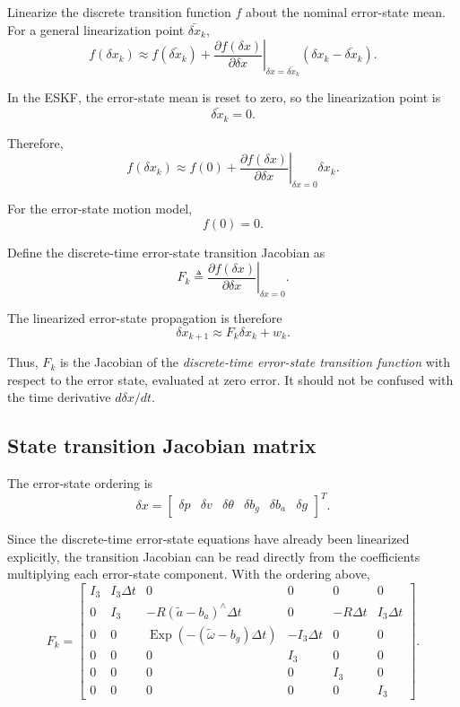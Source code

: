 \documentclass[11pt]{article}
\numberwithin{equation}{section}
\newcommand{\Exp}{\operatorname{Exp}}
\begin{document}
Linearize the discrete transition function $f$ about the nominal
error-state mean.  For a general linearization point
$\bar{\delta x}_k$,
\[
f(\delta x_k)
\approx
f(\bar{\delta x}_k)
+
\left.
\frac{\partial f(\delta x)}
{\partial\delta x}
\right|_{\delta x=\bar{\delta x}_k}
(\delta x_k-\bar{\delta x}_k).
\]

In the ESKF, the error-state mean is reset to zero, so the
linearization point is
\[
\bar{\delta x}_k=0.
\]

Therefore,
\[
f(\delta x_k)
\approx
f(0)
+
\left.
\frac{\partial f(\delta x)}
{\partial\delta x}
\right|_{\delta x=0}
\delta x_k.
\]

For the error-state motion model,
\[
f(0)=0.
\]

Define the discrete-time error-state transition Jacobian as
\begin{equation}
\boxed{
F_k
\triangleq
\left.
\frac{\partial f(\delta x)}
{\partial\delta x}
\right|_{\delta x=0}.
}
\end{equation}

The linearized error-state propagation is therefore
\begin{equation}
\boxed{
\delta x_{k+1}
\approx
F_k\delta x_k+w_k.
}
\end{equation}

Thus, $F_k$ is the Jacobian of the \emph{discrete-time error-state
transition function} with respect to the error state, evaluated at
zero error.  It should not be confused with the time derivative
$d\delta x/dt$.

\subsection{State transition Jacobian matrix}

The error-state ordering is
\begin{equation}
\boxed{
\delta x
=
\begin{bmatrix}
\delta p &
\delta v &
\delta\theta &
\delta b_g &
\delta b_a &
\delta g
\end{bmatrix}^{T}.
}
\end{equation}

Since the discrete-time error-state equations have already been
linearized explicitly, the transition Jacobian can be read directly
from the coefficients multiplying each error-state component.  With
the ordering above,
\begin{equation}
\boxed{
F_k
=
\begin{bmatrix}
I_3
&
I_3\Delta t
&
0
&
0
&
0
&
0
\\[1mm]
0
&
I_3
&
-R(\tilde a-b_a)^\wedge\Delta t
&
0
&
-R\Delta t
&
I_3\Delta t
\\[1mm]
0
&
0
&
\Exp\!\left(-(\tilde\omega-b_g)\Delta t\right)
&
-I_3\Delta t
&
0
&
0
\\[1mm]
0
&
0
&
0
&
I_3
&
0
&
0
\\[1mm]
0
&
0
&
0
&
0
&
I_3
&
0
\\[1mm]
0
&
0
&
0
&
0
&
0
&
I_3
\end{bmatrix}.
}
\end{equation}
\end{document}
